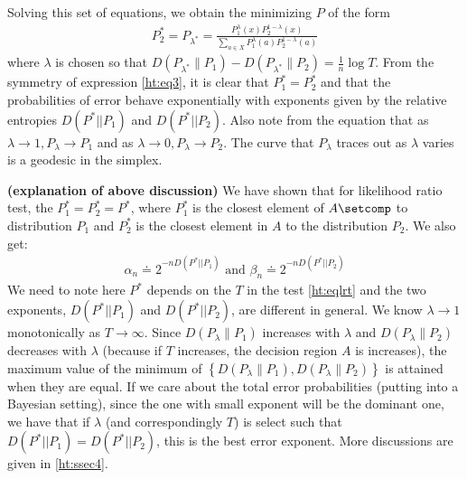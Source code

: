 \documentclass{article}
\newcommand{\bfs}[1]{\textbf{({#1})}}
\begin{document}
Solving this set of equations, we obtain the minimizing $P$ of the form
\begin{align}
P_{2}^{*}=P_{\lambda^{*}}=\frac{P_{1}^{\lambda}(x) P_{2}^{1-\lambda}(x)}{\sum_{a \in X } P_{1}^{\lambda}(a) P_{2}^{1-\lambda}(a)} \label{ht:eq3}
\end{align}
where $\lambda$ is chosen so that $D\left(P_{\lambda^{*}} \| P_{1}\right)-D\left(P_{\lambda^{*}} \| P_{2}\right)=\frac{1}{n} \log T$.
From the symmetry of expression \cref{ht:eq3}, it is clear that $P_{1}^{*}=P_{2}^{*}$ and that the probabilities of error behave exponentially with exponents given by the relative entropies $D\left(P^{*}|| P_{1}\right)$ and $D\left(P^{*}|| P_{2}\right)$. Also note from the equation that as $\lambda \rightarrow 1, P_{\lambda} \rightarrow P_{1}$ and as $\lambda \rightarrow 0, P_{\lambda} \rightarrow P_{2}$. The curve
that $P_{\lambda}$ traces out as $\lambda$ varies is a geodesic in the simplex. 
\begin{rema}{\bfs{explanation of above discussion}} \label{ht:rate}
We have shown that for likelihood ratio test, the $P_{1}^{*}=P_{2}^{*} = P^{*} $, where $P_{1}^{*}$ is the closest element of $A\setcomp$ to distribution $P_{1}$ and $P_{2}^{*}$ is the closest element in $A$ to the distribution $P_{2}$. We also get:
\begin{align}
\alpha_{n} \doteq 2^{-n D\left(P^{*}|| P_{1}\right)} \text{ and } \beta_{n} \doteq 2^{-n D\left(P^{*}|| P_{2}\right)} \label{ht:eqerr_rate}
\end{align}
We need to note here $P^{*}$ depends on the $T$ in the test \cref{ht:eqlrt} and the two exponents, $ D\left(P^{*}|| P_{1}\right)$ and  $D\left(P^{*}|| P_{2}\right)$, are different in general. We know $\lambda\to 1$ monotonically as  $T\to \infty$. Since $D\left(P_{\lambda} \| P_{1}\right)$ increases with $\lambda$ and $D\left(P_{\lambda} \| P_{2}\right)$ decreases with $\lambda$ (because if $T$ increases, the decision region $A$ is increases), the maximum value of the minimum of $\left\{D\left(P_{\lambda} \| P_{1}\right), D\left(P_{\lambda} \| P_{2}\right)\right\}$ is attained when they are equal.
If we care about the total error probabilities (putting into a Bayesian setting), since the one with small exponent will be the dominant one, we have that if $\lambda$ (and correspondingly $T$) is select such that $ D\left(P^{*}|| P_{1}\right)=D\left(P^{*}|| P_{2}\right)$, this is the best error exponent. More discussions are given in \cref{ht:ssec4}.

\end{rema}
\end{document}
